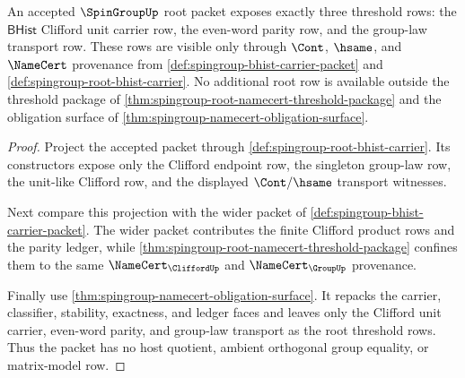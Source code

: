 \begin{theorem}
\label{thm:spingroup-root-threshold-obligation-triple}
An accepted $\SpinGroupUp$ root packet exposes exactly three threshold rows:
the $\mathsf{BHist}$ Clifford unit carrier row, the even-word parity row, and
the group-law transport row. These rows are visible only through $\Cont$,
$\hsame$, and $\NameCert$ provenance from
\autoref{def:spingroup-bhist-carrier-packet} and
\autoref{def:spingroup-root-bhist-carrier}. No additional root row is available
outside the threshold package of
\autoref{thm:spingroup-root-namecert-threshold-package} and the obligation
surface of \autoref{thm:spingroup-namecert-obligation-surface}.
\end{theorem}
\begin{proof}
Project the accepted packet through
\autoref{def:spingroup-root-bhist-carrier}. Its constructors expose only the
Clifford endpoint row, the singleton group-law row, the unit-like Clifford row,
and the displayed $\Cont/\hsame$ transport witnesses.

Next compare this projection with the wider packet of
\autoref{def:spingroup-bhist-carrier-packet}. The wider packet contributes the
finite Clifford product rows and the parity ledger, while
\autoref{thm:spingroup-root-namecert-threshold-package} confines them to the
same $\NameCert_{\CliffordUp}$ and $\NameCert_{\GroupUp}$ provenance.

Finally use \autoref{thm:spingroup-namecert-obligation-surface}. It repacks
the carrier, classifier, stability, exactness, and ledger faces and leaves only
the Clifford unit carrier, even-word parity, and group-law transport as the
root threshold rows. Thus the packet has no host quotient, ambient orthogonal
group equality, or matrix-model row.
\end{proof}

